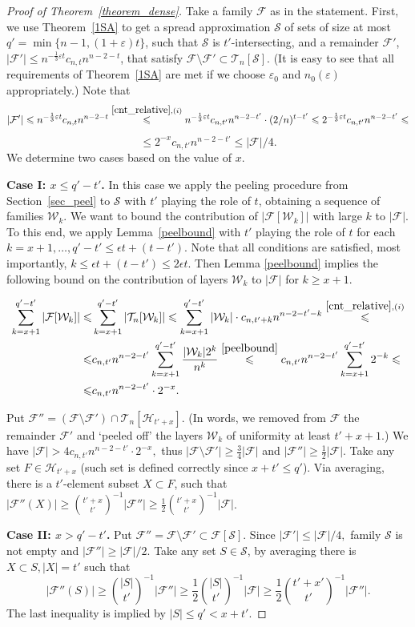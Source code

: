 \documentclass[11pt,letterpaper]{amsart}
\newcommand{\eps}{\varepsilon}
\renewcommand{\le}{\leqslant}
\renewcommand{\ge}{\geqslant}
\newcommand{\ff}{\mathcal{F}}
\newcommand{\s}{\mathcal{S}}
\newcommand{\h}{\mathcal H}
\newcommand{\T}{\mathcal{T}}
\newcommand{\W}{\mathcal{W}}
\begin{document}
\begin{proof}[Proof of Theorem~\ref{theorem_dense}]
Take a family $\ff$ as in the statement. First, we use Theorem~\ref{1SA} to get a spread approximation $\s$ of sets of size at most $q'=\min\{n-1, (1+\eps)t\}$, such that $\s$ is $t'$-intersecting, and a remainder $\ff'$, $|\ff'|\le n^{-\frac 13 \eps t}c_{n, t}n^{n-2-t}$, that satisfy $\ff\setminus \ff'\subset \T_n[\s]$. (It is easy to see that all requirements of Theorem~\ref{1SA} are met if we choose $\eps_0$ and $n_0(\eps)$ appropriately.) Note that $$|\ff'| \le n^{-\frac13\eps t}c_{n, t}n^{n - 2- t}  \overset{\ref{cnt_relative}, (i)}{\le} n^{-\frac13\eps t}c_{n, t'}n^{n - 2- t'}\cdot(2/n)^{t-t'} \le 2^{-\frac13 \eps t}c_{n,t'}n^{n - 2 - t'} \le $$ $$\le 2^{-x}c_{n, t'}n^{n-2-t'} \le |\ff|/4.$$ We determine two cases based on the value of $x$. 

\textbf{Case I: $x \le q' - t'$.} In this case we apply the peeling procedure from Section~\ref{sec_peel} to $\s$ with $t'$ playing the role of $t$, obtaining a sequence of families $\W_k$. We  want to bound the contribution of $|\ff[\W_k]|$ with large $k$ to $|\ff|$. To this end, we apply Lemma~\ref{peelbound} with $t'$ playing the role of $t$ for each $k= x+1,\ldots, q'-t'\le\epsilon t+(t-t')$. Note that all conditions are satisfied, most importantly, $k\le \epsilon t+(t-t')\le 2\epsilon t$. Then Lemma \ref{peelbound} implies the following bound on the contribution of layers $\W_k$ to $|\ff|$ for $k\ge x+1$.

\begin{align}\label{eq_sum} \sum_{k=x+1}^{q'-t'}|\ff[\W_k]| \le& \sum_{k=x+1}^{q'-t'}|\T_n[\W_k]| \le \sum_{k=x+1}^{q'-t'}|\W_{k}|\cdot c_{n, t'+k}n^{n-2-t'-k} \overset{\ref{cnt_relative}, (i)}{\le} \notag\\ \le& c_{n, t'}n^{n-2-t'}\sum_{k=x+1}^{q'-t'} \frac{|\W_k|2^k}{n^k}\overset{\ref{peelbound}}{\le} c_{n, t'}n^{n-2-t'}\sum_{k=x+1}^{q'-t'} 2^{-k}\le \notag\\\le& c_{n, t'}n^{n-2-t'}\cdot 2^{-x}. \end{align}



Put $\ff'' =(\ff\setminus \ff')\cap \T_n[\h_{t'+x}]$. (In words, we removed from $\ff$ the remainder $\ff'$ and `peeled off' the layers $\W_k$ of uniformity at least $t'+x+1$.) We have $|\ff|> 4c_{n, t'}n^{n-2-t'}\cdot 2^{-x},$ thus $|\ff\setminus\ff'|\ge \frac 34|\ff|$ and  $|\ff''|\ge \frac 12 |\ff|$. Take any set $F\in \h_{t'+x}$ (such set is defined correctly since $x + t' \le q'$). Via averaging, there is a $t'$-element subset $X\subset F$, such that $|\ff''(X)|\ge {t'+x\choose t'}^{-1}|\ff''|\ge \frac 12 {t'+x\choose t'}^{-1}|\ff|$.

\textbf{Case II: $x > q' - t'$.} Put $\ff'' = \ff \setminus \ff' \subset \ff[\s]$. Since $|\ff'| \le |\ff|/4,$ family $\s$ is not empty and $|\ff''| \ge |\ff|/2$. Take any set $S \in \s$, by averaging there is $X \subset S, |X| = t'$ such that $$|\ff''(S)| \ge {|S| \choose t'}^{-1}|\ff''| \ge \frac12{|S| \choose t'}^{-1}|\ff| \ge \frac12{t' + x' \choose t'}^{-1}|\ff''|.$$ The last inequality is implied by $|S| \le q' < x + t'$.


\end{proof}
\end{document}
